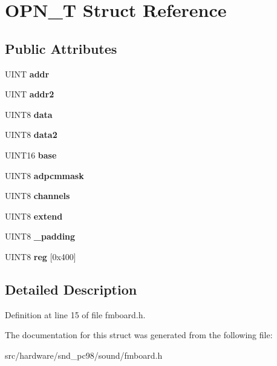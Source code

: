 \hypertarget{structOPN__T}{\section{O\-P\-N\-\_\-\-T Struct Reference}
\label{structOPN__T}
}
\subsection*{Public Attributes}
\begin{DoxyCompactItemize}
\item 
\hypertarget{structOPN__T_a2e26e681086d76234c3d767aa5ddcc81}{U\-I\-N\-T {\bfseries addr}}\label{structOPN__T_a2e26e681086d76234c3d767aa5ddcc81}

\item 
\hypertarget{structOPN__T_a68ebd23270b0316d3deaeff1f475f18d}{U\-I\-N\-T {\bfseries addr2}}\label{structOPN__T_a68ebd23270b0316d3deaeff1f475f18d}

\item 
\hypertarget{structOPN__T_a51808fdc1219c35eb50768af69d58a5a}{U\-I\-N\-T8 {\bfseries data}}\label{structOPN__T_a51808fdc1219c35eb50768af69d58a5a}

\item 
\hypertarget{structOPN__T_aa7a4e8031684a6ece86dad5bc157261c}{U\-I\-N\-T8 {\bfseries data2}}\label{structOPN__T_aa7a4e8031684a6ece86dad5bc157261c}

\item 
\hypertarget{structOPN__T_a683ebf6446569ff3cc87ac7af94f23a0}{U\-I\-N\-T16 {\bfseries base}}\label{structOPN__T_a683ebf6446569ff3cc87ac7af94f23a0}

\item 
\hypertarget{structOPN__T_a92961361a1559733606367de3556c2cb}{U\-I\-N\-T8 {\bfseries adpcmmask}}\label{structOPN__T_a92961361a1559733606367de3556c2cb}

\item 
\hypertarget{structOPN__T_a672f02296b40cfc44e6f375cca61df1c}{U\-I\-N\-T8 {\bfseries channels}}\label{structOPN__T_a672f02296b40cfc44e6f375cca61df1c}

\item 
\hypertarget{structOPN__T_a864776cfec0400a76190d0074a6bbf8d}{U\-I\-N\-T8 {\bfseries extend}}\label{structOPN__T_a864776cfec0400a76190d0074a6bbf8d}

\item 
\hypertarget{structOPN__T_a8da5d4f654c81ef9690d7cc135c3e96f}{U\-I\-N\-T8 {\bfseries \-\_\-padding}}\label{structOPN__T_a8da5d4f654c81ef9690d7cc135c3e96f}

\item 
\hypertarget{structOPN__T_ab07b2d95631e26c81ba6a1145b9fd7f1}{U\-I\-N\-T8 {\bfseries reg} \mbox{[}0x400\mbox{]}}\label{structOPN__T_ab07b2d95631e26c81ba6a1145b9fd7f1}

\end{DoxyCompactItemize}


\subsection{Detailed Description}


Definition at line 15 of file fmboard.\-h.



The documentation for this struct was generated from the following file\-:\begin{DoxyCompactItemize}
\item 
src/hardware/snd\-\_\-pc98/sound/fmboard.\-h\end{DoxyCompactItemize}
